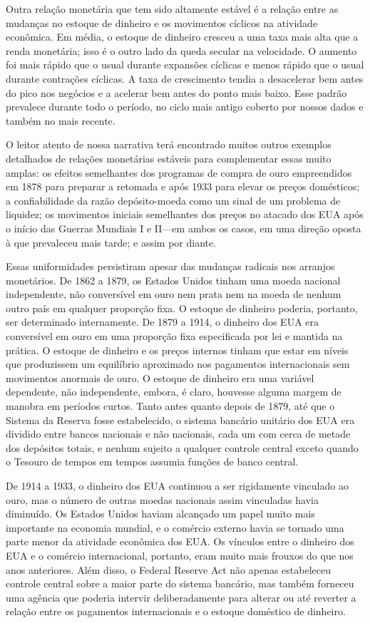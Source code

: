 \documentclass[12pt]{article}
\begin{document}
Outra relação monetária que tem sido altamente estável é a relação entre as mudanças no estoque de dinheiro e os movimentos cíclicos na atividade econômica. Em média, o estoque de dinheiro cresceu a uma taxa mais alta que a renda monetária; isso é o outro lado da queda secular na velocidade. O aumento foi mais rápido que o usual durante expansões cíclicas e menos rápido que o usual durante contrações cíclicas. A taxa de crescimento tendia a desacelerar bem antes do pico nos negócios e a acelerar bem antes do ponto mais baixo. Esse padrão prevalece durante todo o período, no ciclo mais antigo coberto por nossos dados e também no mais recente.

O leitor atento de nossa narrativa terá encontrado muitos outros exemplos detalhados de relações monetárias estáveis para complementar essas muito amplas: os efeitos semelhantes dos programas de compra de ouro empreendidos em 1878 para preparar a retomada e após 1933 para elevar os preços domésticos; a confiabilidade da razão depósito-moeda como um sinal de um problema de liquidez; os movimentos iniciais semelhantes dos preços no atacado dos EUA após o início das Guerras Mundiais I e II—em ambos os casos, em uma direção oposta à que prevaleceu mais tarde; e assim por diante.

Essas uniformidades persistiram apesar das mudanças radicais nos arranjos monetários. De 1862 a 1879, os Estados Unidos tinham uma moeda nacional independente, não conversível em ouro nem prata nem na moeda de nenhum outro país em qualquer proporção fixa. O estoque de dinheiro poderia, portanto, ser determinado internamente. De 1879 a 1914, o dinheiro dos EUA era conversível em ouro em uma proporção fixa especificada por lei e mantida na prática. O estoque de dinheiro e os preços internos tinham que estar em níveis que produzissem um equilíbrio aproximado nos pagamentos internacionais sem movimentos anormais de ouro. O estoque de dinheiro era uma variável dependente, não independente, embora, é claro, houvesse alguma margem de manobra em períodos curtos. Tanto antes quanto depois de 1879, até que o Sistema da Reserva fosse estabelecido, o sistema bancário unitário dos EUA era dividido entre bancos nacionais e não nacionais, cada um com cerca de metade dos depósitos totais, e nenhum sujeito a qualquer controle central exceto quando o Tesouro de tempos em tempos assumia funções de banco central.

De 1914 a 1933, o dinheiro dos EUA continuou a ser rigidamente vinculado ao ouro, mas o número de outras moedas nacionais assim vinculadas havia diminuído. Os Estados Unidos haviam alcançado um papel muito mais importante na economia mundial, e o comércio externo havia se tornado uma parte menor da atividade econômica dos EUA. Os vínculos entre o dinheiro dos EUA e o comércio internacional, portanto, eram muito mais frouxos do que nos anos anteriores. Além disso, o Federal Reserve Act não apenas estabeleceu controle central sobre a maior parte do sistema bancário, mas também forneceu uma agência que poderia intervir deliberadamente para alterar ou até reverter a relação entre os pagamentos internacionais e o estoque doméstico de dinheiro.
\end{document}
